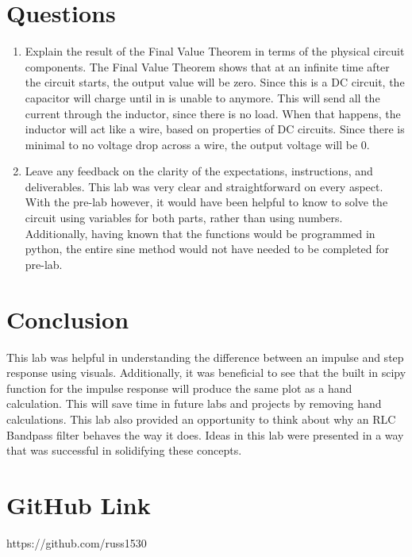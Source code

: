 \documentclass[12pt, titlepage]{article}
\begin{document}
        \section{Questions}
        \begin{enumerate}
            \item Explain the result of the Final Value Theorem in terms  of the physical circuit components.
            \newline
            \newline
            The Final Value Theorem shows that at an infinite time after the circuit starts, the output value will be zero.  Since this is a DC circuit, the capacitor will charge until in is unable to anymore.  This will send all the current through the inductor, since there is no load.  When that happens, the inductor will act like a wire, based on properties of DC circuits.  Since there is minimal to no voltage drop across a wire, the output voltage will be 0.
            \newline
            
            \item Leave any feedback on the clarity of the expectations, instructions, and deliverables.
            \newline
            \newline
            This lab was very clear and straightforward on every aspect.  With the pre-lab however, it would have been helpful to know to solve the circuit using variables for both parts, rather than using numbers.  Additionally, having known that the functions would be programmed in python, the entire sine method would not have needed to be completed for pre-lab.
        \end{enumerate}
       \clearpage
        \section{Conclusion}
       This lab was helpful in understanding the difference between an impulse and step response using visuals.  Additionally, it was beneficial to see that the built in scipy function for the impulse response will produce the same plot as a hand calculation.  This will save time in future labs and projects by removing hand calculations.  This lab also provided an opportunity to think about why an RLC Bandpass filter behaves the way it does.  Ideas in this lab were presented in a way that was successful in solidifying these concepts.  
        \section{GitHub Link}
        https://github.com/russ1530
\end{document}
